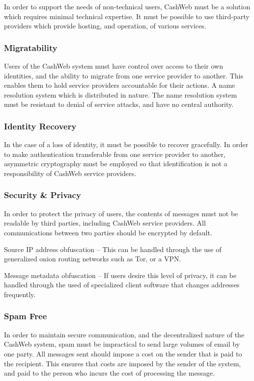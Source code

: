 \documentclass{article}
\theoremstyle{definition}
\begin{document}
In order to support the needs of non-technical users, CashWeb must be a solution which requires minimal technical expertise. It must be possible to use third-party providers which provide hosting, and operation, of various services.

\subsubsection{Migratability}

Users of the CashWeb system must have control over access to their own identities, and the ability to migrate from one service provider to another. This enables them to hold service providers accountable for their actions. A name resolution system which is distributed in nature. The name resolution system must be resistant to denial of service attacks, and have no central authority.

\subsubsection{Identity Recovery}

In the case of a loss of identity, it must be possible to recover gracefully. In order to make authentication transferable from one service provider to another, asymmetric cryptography must be employed so that identification is not a responsibility of CashWeb service providers.

\subsubsection{Security \& Privacy}

In order to protect the privacy of users, the contents of messages must not be readable by third parties, including CashWeb service providers. All communications between two parties should be encrypted by default.

Source IP address obfuscation -- This can be handled through the use of generalized onion routing networks such as Tor, or a VPN.

Message metadata obfuscation -- If users desire this level of privacy, it can be handled through the used of specialized client software that changes addresses frequently.

\subsubsection{Spam Free}

In order to maintain secure communication, and the decentralized nature of the CashWeb system, spam must be impractical to send large volumes of email by one party. All messages sent should impose a cost on the sender that is paid to the recipient. This ensures that costs are imposed by the sender of the system, and paid to the person who incurs the cost of processing the message.
\end{document}
